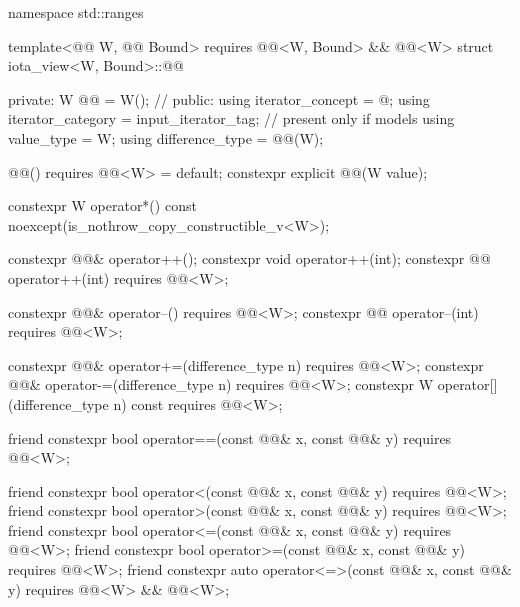 %
\begin{codeblock}
namespace std::ranges {
  template<@@ W, @@ Bound>
    requires @@<W, Bound> && @@<W>
  struct iota_view<W, Bound>::@@ {
  private:
    W @@ = W();             // \expos
  public:
    using iterator_concept = @\seebelow@;
    using iterator_category = input_iterator_tag;       // present only if  models 
    using value_type = W;
    using difference_type = @@(W);

    @@() requires @@<W> = default;
    constexpr explicit @@(W value);

    constexpr W operator*() const noexcept(is_nothrow_copy_constructible_v<W>);

    constexpr @@& operator++();
    constexpr void operator++(int);
    constexpr @@ operator++(int) requires @@<W>;

    constexpr @@& operator--() requires @@<W>;
    constexpr @@ operator--(int) requires @@<W>;

    constexpr @@& operator+=(difference_type n)
      requires @@<W>;
    constexpr @@& operator-=(difference_type n)
      requires @@<W>;
    constexpr W operator[](difference_type n) const
      requires @@<W>;

    friend constexpr bool operator==(const @@& x, const @@& y)
      requires @@<W>;

    friend constexpr bool operator<(const @@& x, const @@& y)
      requires @@<W>;
    friend constexpr bool operator>(const @@& x, const @@& y)
      requires @@<W>;
    friend constexpr bool operator<=(const @@& x, const @@& y)
      requires @@<W>;
    friend constexpr bool operator>=(const @@& x, const @@& y)
      requires @@<W>;
    friend constexpr auto operator<=>(const @@& x, const @@& y)
      requires @@<W> && @@<W>;

}}
\end{codeblock}
